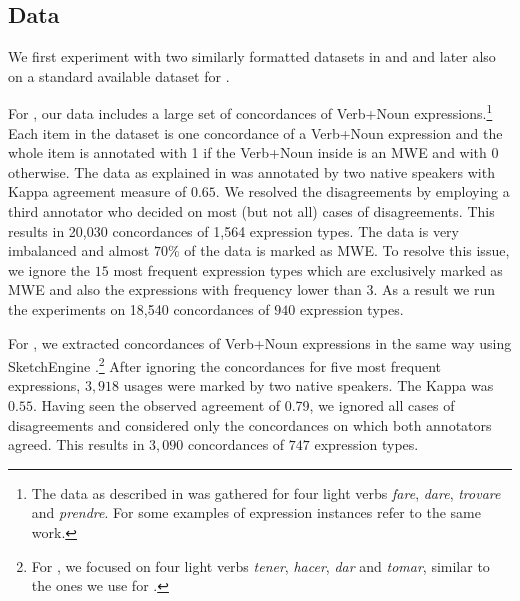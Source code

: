 \documentclass[output=paper,modfonts,nonflat]{langsci/langscibook}
\begin{document}
\subsection{Data}

We first experiment with two similarly formatted datasets in  and  and later also on a %
standard available dataset for .

For , our data includes a large set of concordances of Verb+Noun expressions.\footnote{The data as described in \cite{Taslimipoor2016} was gathered for four light verbs \textit{fare}, \textit{dare}, \textit{trovare} and \textit{prendre}. For some examples of expression instances refer to the same work.} %
Each item in the dataset is one concordance of a Verb+Noun expression and the whole item is annotated with 1 if the Verb+Noun inside is an MWE and with 0 otherwise.
The data as explained in \cite{Taslimipoor2016} was annotated by two native speakers with Kappa agreement measure of $0.65$. We resolved the disagreements by employing a third annotator who decided on most (but not all) cases of disagreements. This results in 20,030 concordances of 1,564 expression types. The  data is very imbalanced and almost $70\%$ of the data is marked as MWE. To resolve this issue, we ignore the $15$ most frequent expression types which are exclusively marked as MWE and also the expressions with frequency lower than $3$. As a result we run the experiments on 18,540 concordances of $940$ expression types.

For , we extracted concordances of Verb+Noun expressions in the same way using SketchEngine \citep{kilgarriff2004}.\footnote{For , we focused on four light verbs \textit{tener}, \textit{hacer}, \textit{dar} and \textit{tomar}, similar to the ones we use for .} After ignoring the concordances for five most frequent expressions, $3,918$ usages were marked by two native speakers. The Kappa  was $0.55$. Having seen the observed agreement of 0.79, we ignored all cases of disagreements and considered only the concordances on which both annotators agreed. 
This results in $3,090$ concordances of $747$ expression types.  
\end{document}
